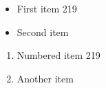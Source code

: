 \documentclass{article}
\begin{document}
\begin{itemize}
\item First item 219
\item Second item
\end{itemize}
\begin{enumerate}
\item Numbered item 219
\item Another item
\end{enumerate}
\end{document}
